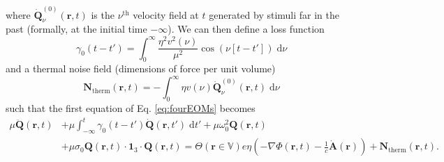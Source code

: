 where $\dot{\mathbf{Q}}^{(0)}_\nu(\mathbf{r},t)$ is the $\nu^\mathrm{th}$ velocity field at $t$ generated by stimuli far in the past (formally, at the initial time $-\infty$). We can then define a loss function
\begin{equation}
\gamma_0(t - t') = \int_0^\infty\frac{ \eta^2 v^2(\nu)}{\mu^2}\cos(\nu[t - t'])\;\mathrm{d}\nu
\end{equation}
and a thermal noise field (dimensions of force per unit volume)
\begin{equation}
\mathbf{N}_\mathrm{therm}(\mathbf{r},t) = -\int_0^\infty \eta v(\nu)\dot{\mathbf{Q}}^{(0)}_\nu(\mathbf{r},t)\;\mathrm{d}\nu
\end{equation}
such that the first equation of Eq. \eqref{eq:fourEOMs} becomes
\begin{equation}\label{eq:matterEOM}
\begin{split}
\mu\ddot{\mathbf{Q}}(\mathbf{r},t) &+ \mu\int_{-\infty}^t\gamma_0(t - t')\dot{\mathbf{Q}}(\mathbf{r},t')\;\mathrm{d}t' + \mu\omega_0^2\mathbf{Q}(\mathbf{r},t)\\
&+ \mu\sigma_0\mathbf{Q}(\mathbf{r},t)\cdot\bm{1}_3\cdot\mathbf{Q}(\mathbf{r},t) = \Theta(\mathbf{r}\in\mathbb{V})e\eta\left(-\nabla\Phi(\mathbf{r},t) - \frac{1}{c}\dot{\mathbf{A}}(\mathbf{r})\right) + \mathbf{N}_\mathrm{therm}(\mathbf{r},t).
\end{split}
\end{equation}

